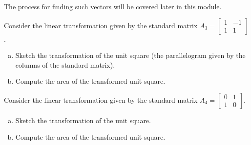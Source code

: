 \begin{applicationActivities}
\begin{observation}
  \begin{center}
  \end{center}

  The process for finding such vectors will be covered later in this module.
\end{observation}


\begin{activity}{5}
Consider the linear transformation given by the standard matrix
 $A_3 = \begin{bmatrix} 1 & -1 \\ 1 & 1 \end{bmatrix}$.

\begin{enumerate}[(a)]
\item Sketch the transformation of the unit square
      (the parallelogram given by the columns of the standard matrix).
\item Compute the area of the transformed unit square.
\end{enumerate}
\end{activity}


\begin{activity}{5}
Consider the linear transformation given by the standard matrix
 $A_4 = \begin{bmatrix} 0 & 1 \\ 1 & 0 \end{bmatrix}$.

\begin{enumerate}[(a)]
\item Sketch the transformation of the unit square.
\item Compute the area of the transformed unit square.
\end{enumerate}
\end{activity}


\end{applicationActivities}
